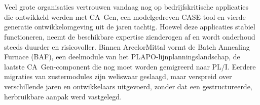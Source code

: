 
%
%
%
%
%

%



\chapter*{}

Veel grote organisaties vertrouwen vandaag nog op bedrijfskritische applicaties die ontwikkeld werden met
CA~Gen, een modelgedreven CASE-tool en vierde generatie ontwikkelomgeving uit de jaren tachtig. Hoewel
deze applicaties stabiel functioneren, neemt de beschikbare expertise zienderogen af en wordt onderhoud
steeds duurder en risicovoller. Binnen ArcelorMittal vormt de Batch Annealing Furnace (BAF), een
deelmodule van het PLAPO-lijnplanningslandschap, de laatste CA~Gen-component die nog moet worden
gemigreerd naar PL/I. Eerdere migraties van zustermodules zijn weliswaar geslaagd, maar verspreid over
verschillende jaren en ontwikkelaars uitgevoerd, zonder dat een gestructureerde, herbruikbare aanpak werd
vastgelegd.

